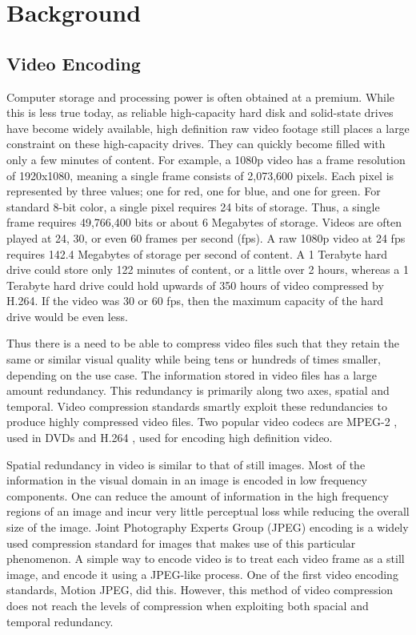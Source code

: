 \chapter{Background}

\section{Video Encoding}

Computer storage and processing power is often obtained at a premium. While this is less true today, as reliable high-capacity hard disk and solid-state drives have become widely available, high definition raw video footage still places a large constraint on these high-capacity drives. They can quickly become filled with only a few minutes of content. For example, a 1080p video has a frame resolution of 1920x1080, meaning a single frame consists of 2,073,600 pixels. Each pixel is represented by three values; one for red, one for blue, and one for green. For standard 8-bit color, a single pixel requires 24 bits of storage. Thus, a single frame requires 49,766,400 bits or about 6 Megabytes of storage. Videos are often played at 24, 30, or even 60 frames per second (fps). A raw 1080p video at 24 fps requires 142.4 Megabytes of storage per second of content. A 1 Terabyte hard drive could store only 122 minutes of content, or a little over 2 hours, whereas a 1 Terabyte hard drive could hold upwards of 350 hours of video compressed by H.264. If the video was 30 or 60 fps, then the maximum capacity of the hard drive would be even less.

Thus there is a need to be able to compress video files such that they retain the same or similar visual quality while being tens or hundreds of times smaller, depending on the use case. The information stored in video files has a large amount redundancy. This redundancy is primarily along two axes, spatial and temporal. Video compression standards smartly exploit these redundancies to produce highly compressed video files. Two popular video codecs are MPEG-2 \cite{mpeg2}, used in DVDs and H.264 \cite{h264}, used for encoding high definition video.

Spatial redundancy in video is similar to that of still images. Most of the information in the visual domain in an image is encoded in low frequency components. One can reduce the amount of information in the high frequency regions of an image and incur very little perceptual loss while reducing the overall size of the image. Joint Photography Experts Group (JPEG) encoding is a widely used compression standard for images that makes use of this particular phenomenon. A simple way to encode video is to treat each video frame as a still image, and encode it using a JPEG-like process. One of the first video encoding standards, Motion JPEG, did this. However, this method of video compression does not reach the levels of compression when exploiting both spacial and temporal redundancy.

